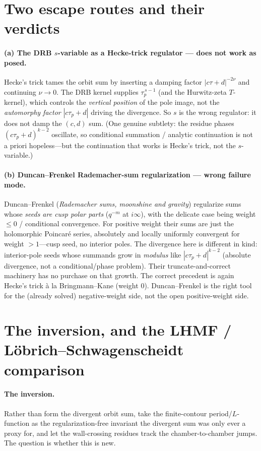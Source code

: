 \documentclass[11pt]{article}
\newcommand{\taup}{\tau_p}
\begin{document}
\section{Two escape routes and their verdicts}

\paragraph{(a) The DRB $s$-variable as a Hecke-trick regulator --- does not work as posed.}
Hecke's trick tames the orbit sum by inserting a damping factor $|c\tau+d|^{-2\nu}$ and
continuing $\nu\to0$. The DRB kernel supplies $\taup^{\,s-1}$ (and the Hurwitz-zeta
$T$-kernel), which controls the \emph{vertical position} of the pole image, not the
\emph{automorphy factor} $|c\taup+d|$ driving the divergence. So $s$ is the wrong
regulator: it does not damp the $(c,d)$ sum. (One genuine subtlety: the residue phases
$(c\taup+d)^{k-2}$ oscillate, so conditional summation / analytic continuation is not a
priori hopeless---but the continuation that works is Hecke's trick, not the $s$-variable.)

\paragraph{(b) Duncan--Frenkel Rademacher-sum regularization --- wrong failure mode.}
Duncan--Frenkel (\emph{Rademacher sums, moonshine and gravity}) regularize sums whose
\emph{seeds are cusp polar parts} ($q^{-m}$ at $i\infty$), with the delicate case being
weight $\le 0$ / conditional convergence. For positive weight their sums are just the
holomorphic Poincar\'e series, absolutely and locally uniformly convergent for weight
$>1$---cusp seed, no interior poles. The divergence here is different in kind: interior-pole
seeds whose summands grow in \emph{modulus} like $|c\taup+d|^{k-2}$ (absolute divergence,
not a conditional/phase problem). Their truncate-and-correct machinery has no purchase on
that growth. The correct precedent is again Hecke's trick \`a la Bringmann--Kane (weight
$0$). Duncan--Frenkel is the right tool for the (already solved) negative-weight side, not
the open positive-weight side.

\section{The inversion, and the LHMF / L\"obrich--Schwagenscheidt comparison}

\paragraph{The inversion.}
Rather than form the divergent orbit sum, take the finite-contour period/$L$-function as
the regularization-free invariant the divergent sum was only ever a proxy for, and let
the wall-crossing residues track the chamber-to-chamber jumps. The question is whether
this is new.
\end{document}
